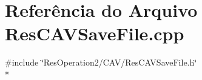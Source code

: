 \section{Referência do Arquivo Res\+C\+A\+V\+Save\+File.\+cpp}
\label{_2_c_a_v_2_res_c_a_v_save_file_8cpp}
{\ttfamily \#include \char`\"{}Res\+Operation2/\+C\+A\+V/\+Res\+C\+A\+V\+Save\+File.\+h\char`\"{}}\\*
